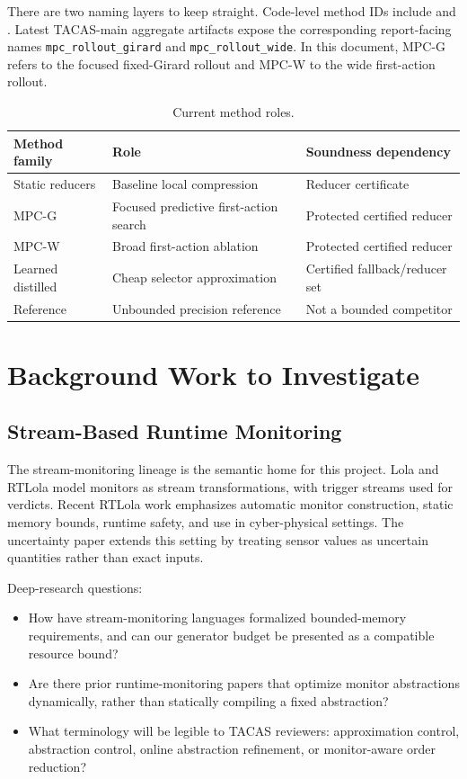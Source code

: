 \documentclass[11pt]{article}
\newcommand{\mpcg}{\textsc{MPC-G}}
\newcommand{\mpcw}{\textsc{MPC-W}}
\begin{document}
There are two naming layers to keep straight. Code-level method IDs include
 and
. Latest TACAS-main aggregate artifacts expose
the corresponding report-facing names \texttt{mpc\_rollout\_girard} and
\texttt{mpc\_rollout\_wide}. In this document, \mpcg{} refers to the focused
fixed-Girard rollout and \mpcw{} to the wide first-action rollout.

\begin{table}[htbp]
\centering
\caption{Current method roles.}
\begin{tabular}{lll}
\toprule
Method family & Role & Soundness dependency \\
\midrule
Static reducers & Baseline local compression & Reducer certificate \\
\mpcg{} & Focused predictive first-action search & Protected certified reducer \\
\mpcw{} & Broad first-action ablation & Protected certified reducer \\
Learned distilled & Cheap selector approximation & Certified fallback/reducer set \\
Reference & Unbounded precision reference & Not a bounded competitor \\
\bottomrule
\end{tabular}
\end{table}

\section{Background Work to Investigate}

\subsection{Stream-Based Runtime Monitoring}

The stream-monitoring lineage is the semantic home for this project. Lola and
RTLola model monitors as stream transformations, with trigger streams used for
verdicts. Recent RTLola work emphasizes automatic monitor construction, static
memory bounds, runtime safety, and use in cyber-physical settings. The
uncertainty paper extends this setting by treating sensor values as uncertain
quantities rather than exact inputs.

Deep-research questions:

\begin{itemize}
\item How have stream-monitoring languages formalized bounded-memory
requirements, and can our generator budget be presented as a compatible
resource bound?
\item Are there prior runtime-monitoring papers that optimize monitor
abstractions dynamically, rather than statically compiling a fixed abstraction?
\item What terminology will be legible to TACAS reviewers: approximation
control, abstraction control, online abstraction refinement, or monitor-aware
order reduction?
\end{itemize}
\end{document}
